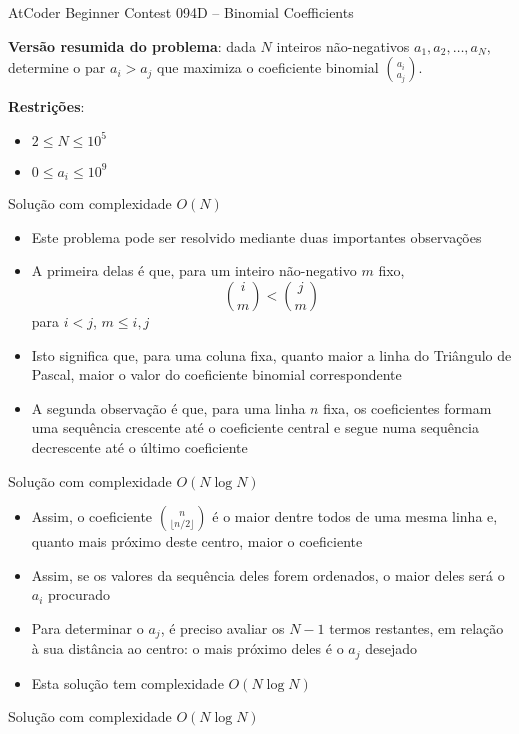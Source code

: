 \begin{frame}[fragile]{AtCoder Beginner Contest 094D -- Binomial Coefficients}

    \textbf{Versão resumida do problema}: dada $N$ inteiros não-negativos $a_1, a_2, \ldots, a_N$,
        determine o par $a_i > a_j$ que maximiza o coeficiente binomial $\binom{a_i}{a_j}$.

    \vspace{0.1in}
    \textbf{Restrições}:
    \begin{itemize}
        \item $2\leq N\leq 10^5$
        \item $0\leq a_i\leq 10^9$
    \end{itemize}
\end{frame}

\begin{frame}[fragile]{Solução com complexidade $O(N)$}

    \begin{itemize}
        \item Este problema pode ser resolvido mediante duas importantes observações

        \item A primeira delas é que, para um inteiro não-negativo $m$ fixo,
        $$
            \binom{i}{m} < \binom{j}{m}
        $$
        para $i < j$, $m \leq i, j$

        \item Isto significa que, para uma coluna fixa, quanto maior a linha do Triângulo de
            Pascal, maior o valor do coeficiente binomial correspondente

        \item A segunda observação é que, para uma linha $n$ fixa, os coeficientes formam uma
            sequência crescente até o coeficiente central e segue numa sequência decrescente
            até o último coeficiente
    \end{itemize}

\end{frame}

\begin{frame}[fragile]{Solução com complexidade $O(N\log N)$}

    \begin{itemize}
        \item Assim, o coeficiente $\binom{n}{\lfloor n/2\rfloor}$ é o maior dentre todos de uma
            mesma linha e, quanto mais próximo deste centro, maior o coeficiente

        \item Assim, se os valores da sequência deles forem ordenados, o maior deles será o $a_i$
            procurado

        \item Para determinar o $a_j$, é preciso avaliar os $N - 1$ termos restantes, em relação
            à sua distância ao centro: o mais próximo deles é o $a_j$ desejado

        \item Esta solução tem complexidade $O(N\log N)$
    \end{itemize}

\end{frame}

\begin{frame}[fragile]{Solução com complexidade $O(N\log N)$}
\end{frame}
